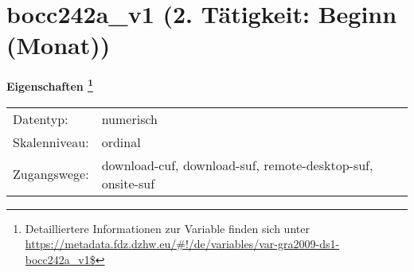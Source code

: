 
    \setcounter{footnote}{0}

    \vspace*{-1.8cm}
	\section{bocc242a\_v1 (2. Tätigkeit: Beginn (Monat))}
	\label{section:bocc242a_v1}



    \vspace*{0.5cm}
    \noindent\textbf{Eigenschaften
	\footnote{Detailliertere Informationen zur Variable finden sich unter
		\url{https://metadata.fdz.dzhw.eu/\#!/de/variables/var-gra2009-ds1-bocc242a_v1$}}}\\
	\begin{tabularx}{\hsize}{@{}lX}
	Datentyp: & numerisch \\
	Skalenniveau: & ordinal \\
	Zugangswege: &
	  download-cuf, 
	  download-suf, 
	  remote-desktop-suf, 
	  onsite-suf
 \\
    \end{tabularx}



